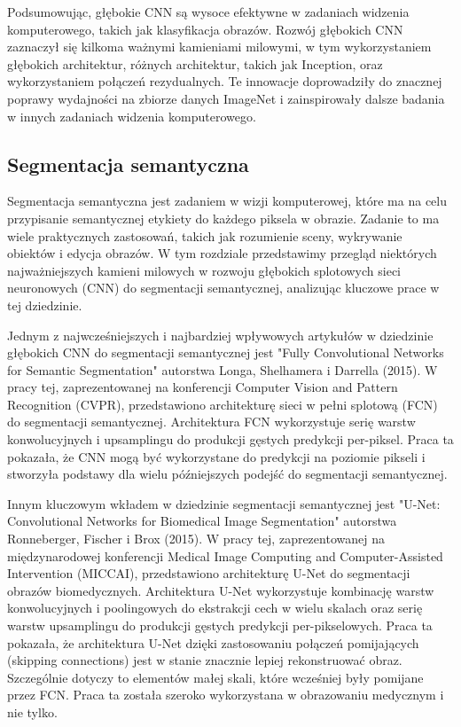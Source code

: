 Podsumowując, głębokie CNN są wysoce efektywne w zadaniach widzenia komputerowego, takich jak klasyfikacja obrazów. Rozwój głębokich CNN zaznaczył się kilkoma ważnymi kamieniami milowymi, w tym wykorzystaniem głębokich architektur, różnych architektur, takich jak Inception, oraz wykorzystaniem połączeń rezydualnych. Te innowacje doprowadziły do znacznej poprawy wydajności na zbiorze danych ImageNet i zainspirowały dalsze badania w innych zadaniach widzenia komputerowego.
\subsection{Segmentacja semantyczna}
Segmentacja semantyczna jest zadaniem w wizji komputerowej, które ma na celu przypisanie semantycznej etykiety do każdego piksela w obrazie. Zadanie to ma wiele praktycznych zastosowań, takich jak rozumienie sceny, wykrywanie obiektów i edycja obrazów. W tym rozdziale przedstawimy przegląd niektórych najważniejszych kamieni milowych w rozwoju głębokich splotowych sieci neuronowych (CNN) do segmentacji semantycznej, analizując kluczowe prace w tej dziedzinie.

Jednym z najwcześniejszych i najbardziej wpływowych artykułów w dziedzinie głębokich CNN do segmentacji semantycznej jest "Fully Convolutional Networks for Semantic Segmentation" autorstwa Longa, Shelhamera i Darrella (2015)\cite{fcn}. W pracy tej, zaprezentowanej na konferencji Computer Vision and Pattern Recognition (CVPR), przedstawiono architekturę sieci w pełni splotową (FCN) do segmentacji semantycznej. Architektura FCN wykorzystuje serię warstw konwolucyjnych i upsamplingu do produkcji gęstych predykcji per-piksel. Praca ta pokazała, że CNN mogą być wykorzystane do predykcji na poziomie pikseli i stworzyła podstawy dla wielu późniejszych podejść do segmentacji semantycznej.

Innym kluczowym wkładem w dziedzinie segmentacji semantycznej jest "U-Net: Convolutional Networks for Biomedical Image Segmentation" autorstwa Ronneberger, Fischer i Brox (2015)\cite{ronneberger2015u}. W pracy tej, zaprezentowanej na międzynarodowej konferencji Medical Image Computing and Computer-Assisted Intervention (MICCAI), przedstawiono architekturę U-Net do segmentacji obrazów biomedycznych. Architektura U-Net wykorzystuje kombinację warstw konwolucyjnych i poolingowych do ekstrakcji cech w wielu skalach oraz serię warstw upsamplingu do produkcji gęstych predykcji per-pikselowych. Praca ta pokazała, że architektura U-Net dzięki zastosowaniu połączeń pomijających (skipping connections) jest w stanie znacznie lepiej rekonstruować obraz. Szczególnie dotyczy to elementów małej skali, które wcześniej były pomijane przez FCN. Praca ta została szeroko wykorzystana w obrazowaniu medycznym i nie tylko.

